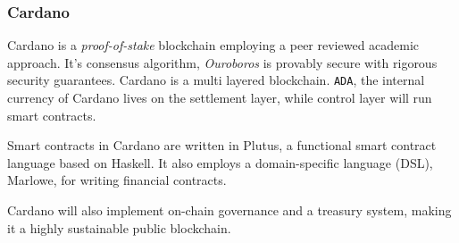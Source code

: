 \subsubsection{Cardano}
Cardano\cite{web:cardano:1} is a \textit{proof-of-stake} blockchain employing a peer reviewed academic approach. It's consensus algorithm, \textit{Ouroboros}\cite{kiayias2017ouroboros} is provably secure with rigorous security guarantees. Cardano is a multi layered blockchain. \texttt{ADA}, the internal currency of Cardano lives on the settlement layer, while control layer will run smart contracts.

Smart contracts in Cardano are written in Plutus\cite{web:plutus:1}, a functional smart contract language based on Haskell. It also employs a domain-specific language (DSL), Marlowe\cite{seijas2018marlowe}, for writing financial contracts.

Cardano will also implement on-chain governance and a {treasury system}\cite{zhang2019treasury}, making it a highly sustainable public blockchain.